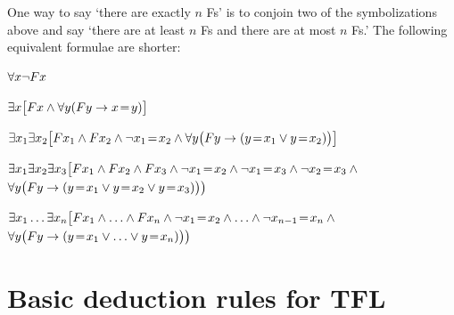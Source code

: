 One way to say `there are exactly $n$ Fs' is to conjoin two of the symbolizations above and say `there are at least $n$ Fs and there are at most $n$ Fs.' The following equivalent formulae are shorter:
\begin{ekey}
\item[\text{zero}] $\forall x\neg Fx$
\item[\text{one}] $\exists x\bigl[Fx \mathbin{\wedge} \forall y(Fy \rightarrow x\!=\!  y)\bigr]$
\item[\text{two}] $\exists x_1\exists x_2\bigl[Fx_1 \mathbin{\wedge} Fx_2 \mathbin{\wedge} \neg x_1 \!=\!  x_2 \mathbin{\wedge} \forall y\bigl(Fy \rightarrow (y\!=\!  x_1 \vee y \!=\!  x_2)\bigr) \bigr]$
\item[\text{three}] $\exists x_1\exists x_2\exists x_3\bigl[Fx_1 \mathbin{\wedge} Fx_2 \mathbin{\wedge} Fx_3 \mathbin{\wedge} \neg x_1 \!=\!   x_2 \mathbin{\wedge} \neg  x_1 \!=\!  x_3 \mathbin{\wedge} \neg x_2 \!=\!  x_3 \mathbin{\wedge} \phantom{.}$\\
\phantom{$\exists x_1 \exists x_2$}$\forall y\bigl(Fy \rightarrow (y \!=\!  x_1 \vee y \!=\!  x_2 \vee y \!=\!   x_3)\bigr) \bigr)$
\item[n] $\exists x_1\ldots\exists x_n\bigl[Fx_1 \mathbin{\wedge}\ldots\mathbin{\wedge} Fx_n  \mathbin{\wedge} \neg x_1 \!=\!  x_2 \mathbin{\wedge}\ldots\mathbin{\wedge} \neg x_{n-1}\!=\!  x_n \mathbin{\wedge} \phantom{.}$\\
\phantom{$\exists x_1\exists x_2$}$\forall y\bigl(Fy \rightarrow (y\!=\!  x_1 \vee \ldots \vee y\!=\!  x_n)\bigr)\bigr)$ 
\end{ekey}


\newpage
\section{Basic deduction rules for TFL}\label{appendix:quickref:basic rules TFL}
\renewenvironment{fitchproof}
	{\noindent\par\noindent\small$\begin{nd}}
	{\end{nd}$\noindent\normalsize\ignorespacesafterend}
	
